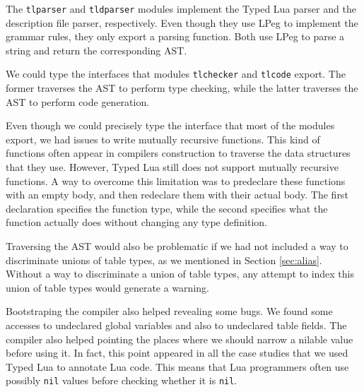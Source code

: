 The \texttt{tlparser} and \texttt{tldparser} modules implement the Typed Lua
parser and the description file parser, respectively.
Even though they use LPeg to implement the grammar rules,
they only export a parsing function.
Both use LPeg to parse a string and return the corresponding AST.

We could type the interfaces that modules \texttt{tlchecker} and
\texttt{tlcode} export.
The former traverses the AST to perform type checking,
while the latter traverses the AST to perform code generation.

Even though we could precisely type the interface that most of
the modules export, we had issues to write mutually recursive functions.
This kind of functions often appear in compilers construction
to traverse the data structures that they use.
However, Typed Lua still does not support mutually recursive functions.
A way to overcome this limitation was to predeclare these functions
with an empty body, and then redeclare them with their actual body.
The first declaration specifies the function type, while the
second specifies what the function actually does without changing
any type definition.

Traversing the AST would also be problematic if we had not included
a way to discriminate unions of table types, as we mentioned in Section \ref{sec:alias}.
Without a way to discriminate a union of table types, any attempt
to index this union of table types would generate a warning.

Bootstraping the compiler also helped revealing some bugs.
We found some accesses to undeclared global variables and also
to undeclared table fields.
The compiler also helped pointing the places where we should narrow
a nilable value before using it.
In fact, this point appeared in all the case studies that we used
Typed Lua to annotate Lua code.
This means that Lua programmers often use possibly \texttt{nil} values
before checking whether it is \texttt{nil}.

